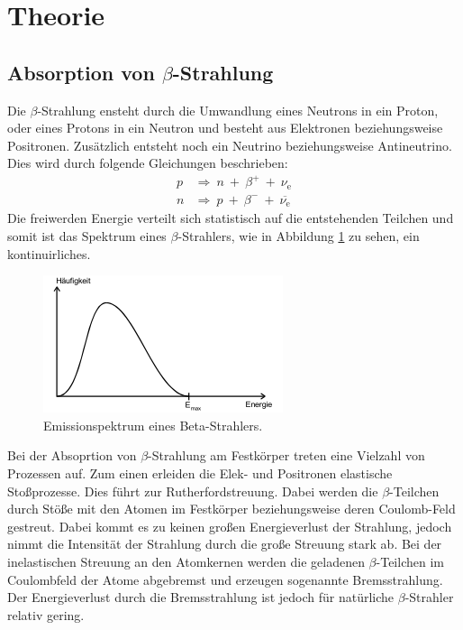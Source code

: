 \section{Theorie}
\label{sec:Theorie}
\subsection{Absorption von \texorpdfstring{$\beta$}{beta}-Strahlung}
Die $\beta$-Strahlung ensteht durch die Umwandlung eines Neutrons in ein Proton, oder eines Protons in ein Neutron und besteht aus Elektronen beziehungsweise Positronen.
Zusätzlich entsteht noch ein Neutrino beziehungsweise Antineutrino.
Dies wird durch folgende Gleichungen beschrieben:
\begin{align*}
  p & \Rightarrow \: n \: + \: {\beta}^{+} \: + \: \nu_\text{e} \\
  n & \Rightarrow \: p \: + \: {\beta}^{-} \: + \: \overline{\nu_\text{e}}
\end{align*}
Die freiwerden Energie verteilt sich statistisch auf die entstehenden Teilchen und somit ist das Spektrum eines $\beta$-Strahlers, wie in Abbildung \ref{fig:betaspektrum}
zu sehen, ein kontinuirliches.
\begin{figure}
  \centering
  \includegraphics{pictures/betaspektrum.png}
  \caption{Emissionspektrum eines Beta-Strahlers.\cite{sample}}
  \label{fig:betaspektrum}
\end{figure}
Bei der Absoprtion von $\beta$-Strahlung am Festkörper treten eine Vielzahl von Prozessen auf.
Zum einen erleiden die Elek- und Positronen elastische Stoßprozesse. Dies führt zur Rutherfordstreuung.
Dabei werden die $\beta$-Teilchen durch Stöße mit den Atomen im Festkörper beziehungsweise deren Coulomb-Feld gestreut. Dabei kommt es zu keinen großen Energieverlust der Strahlung,
jedoch nimmt die Intensität der Strahlung durch die große Streuung stark ab.
Bei der inelastischen Streuung an den Atomkernen werden die geladenen $\beta$-Teilchen im Coulombfeld der Atome abgebremst und erzeugen sogenannte Bremsstrahlung.
Der Energieverlust durch die Bremsstrahlung ist jedoch für natürliche $\beta$-Strahler relativ gering.
